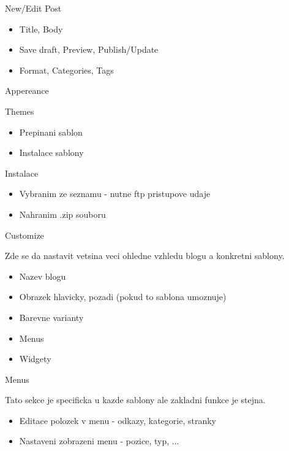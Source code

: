 \documentclass{beamer}
\begin{document}
\begin{frame}
    {New/Edit Post}

    \begin{itemize}
        \item Title, Body
        \item Save draft, Preview, Publish/Update
        \item Format, Categories, Tags
    \end{itemize}
\end{frame}


\begin{frame}
    {Appereance}

\end{frame}


\begin{frame}
    {Themes}

    \begin{itemize}
        \item Prepinani sablon
        \item Instalace sablony
    \end{itemize}
\end{frame}


\begin{frame}
    {Instalace}

    \begin{itemize}
        \item Vybranim ze seznamu - nutne ftp pristupove udaje
        \item Nahranim .zip souboru
    \end{itemize}
\end{frame}


\begin{frame}
    {Customize}

    Zde se da nastavit vetsina veci ohledne vzhledu blogu a konkretni sablony.

    \begin{itemize}
        \item Nazev blogu
        \item Obrazek hlavicky, pozadi (pokud to sablona umoznuje)
        \item Barevne varianty
        \item Menus
        \item Widgety
    \end{itemize}
\end{frame}


\begin{frame}
    {Menus}

    Tato sekce je specificka u kazde sablony ale zakladni funkce je stejna.

    \begin{itemize}
        \item Editace polozek v menu - odkazy, kategorie, stranky
        \item Nastaveni zobrazeni menu - pozice, typ, ...
    \end{itemize}
\end{frame}
\end{document}

